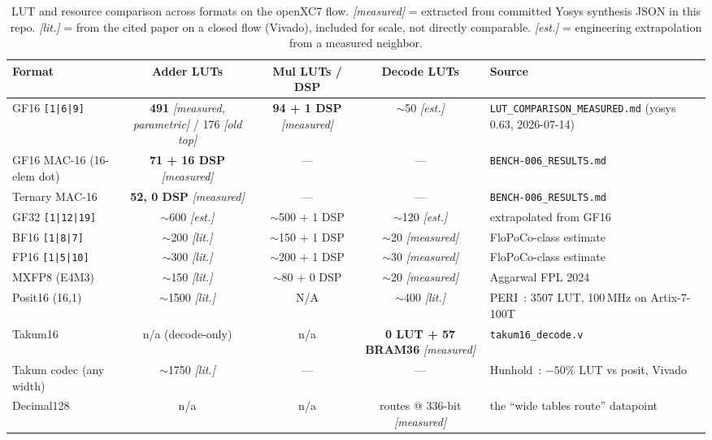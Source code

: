 \documentclass[11pt]{article}
\begin{document}
\begin{table}[h]
\centering
\small
\caption{LUT and resource comparison across formats on the openXC7 flow.
\textit{[measured]} = extracted from committed Yosys synthesis JSON in this
repo. \textit{[lit.]} = from the cited paper on a closed flow (Vivado),
included for scale, not directly comparable. \textit{[est.]} = engineering
extrapolation from a measured neighbor.}
\label{tab:lut}
\begin{tabular}{lcccp{3.4cm}}
\toprule
Format & Adder LUTs & Mul LUTs / DSP & Decode LUTs & Source \\
\midrule
GF16 \texttt{[1|6|9]}
  & \textbf{491} \textit{[measured, parametric]} / 176 \textit{[old top]}
  & \textbf{94 + 1 DSP} \textit{[measured]}
  & ${\sim}$50 \textit{[est.]}
  & \texttt{LUT\_COMPARISON\_MEASURED.md} (yosys 0.63, 2026-07-14) \\
GF16 MAC-16 (16-elem dot)
  & \textbf{71 + 16 DSP} \textit{[measured]}
  & --- & --- & \texttt{BENCH-006\_RESULTS.md} \\
Ternary MAC-16
  & \textbf{52, 0 DSP} \textit{[measured]}
  & --- & --- & \texttt{BENCH-006\_RESULTS.md} \\
GF32 \texttt{[1|12|19]}
  & ${\sim}$600 \textit{[est.]}
  & ${\sim}$500 + 1 DSP
  & ${\sim}$120 \textit{[est.]}
  & extrapolated from GF16 \\
BF16 \texttt{[1|8|7]}
  & ${\sim}$200 \textit{[lit.]}
  & ${\sim}$150 + 1 DSP
  & ${\sim}$20 \textit{[measured]}
  & FloPoCo-class estimate \\
FP16 \texttt{[1|5|10]}
  & ${\sim}$300 \textit{[lit.]}
  & ${\sim}$200 + 1 DSP
  & ${\sim}$30 \textit{[measured]}
  & FloPoCo-class estimate \\
MXFP8 (E4M3)
  & ${\sim}$150 \textit{[lit.]}
  & ${\sim}$80 + 0 DSP
  & ${\sim}$20 \textit{[measured]}
  & Aggarwal FPL 2024~\cite{aggarwal2024minifloat} \\
Posit16 (16,1)
  & ${\sim}$1500 \textit{[lit.]}
  & N/A
  & ${\sim}$400 \textit{[lit.]}
  & PERI~\cite{tiwari2019peri}: 3507 LUT, 100\,MHz on Artix-7-100T \\
Takum16
  & n/a (decode-only)
  & n/a
  & \textbf{0 LUT + 57 BRAM36} \textit{[measured]}
  & \texttt{takum16\_decode.v} \\
Takum codec (any width)
  & ${\sim}$1750 \textit{[lit.]}
  & --- & ---
  & Hunhold~\cite{hunhold2024takumcodec}: $-50\%$ LUT vs posit, Vivado \\
Decimal128
  & n/a & n/a
  & routes @ 336-bit \textit{[measured]}
  & the ``wide tables route'' datapoint \\
\bottomrule
\end{tabular}
\end{table}
\end{document}
